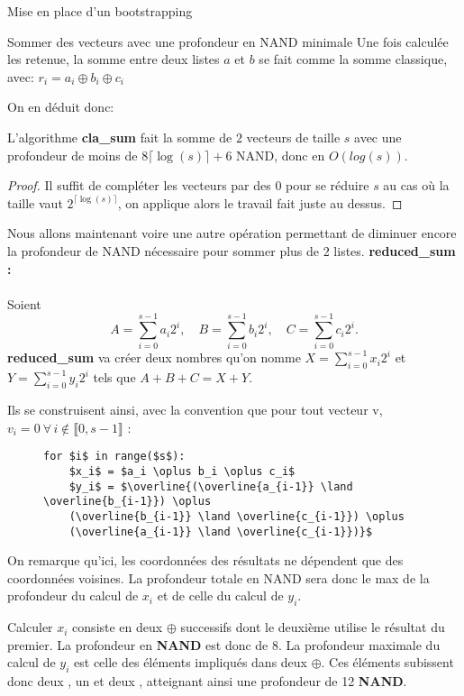 \begin{section}{Mise en place d'un bootstrapping}
\begin{subsection}{Sommer des vecteurs avec une profondeur en NAND minimale}
Une fois calculée les retenue, la somme entre deux listes $a$ et $b$ se fait
comme la somme classique, avec:
$r_i = a_i \oplus b_i \oplus c_i$

On en déduit donc:

\begin{thm}
L'algorithme \textbf{cla\_sum} fait la somme de $2$ vecteurs de taille $s$ 
avec une profondeur de moins de $8 \lceil \log(s) \rceil + 6$ NAND, donc 
en $O(log(s))$.
\end{thm}
\begin{proof}
Il suffit de compléter les vecteurs par des $0$ pour se réduire $s$ au cas où
la taille vaut $2^{\lceil \log(s) \rceil}$, on applique alors le travail fait juste au dessus.
\end{proof}

Nous allons maintenant voire une autre opération permettant de diminuer 
encore la profondeur de NAND nécessaire pour sommer plus de 2 listes. 
\vspace{0.3cm}
\noindent
\textbf{reduced\_sum :}
\paragraph{}

	Soient 
\[A = \sum_{i=0}^{s-1} a_i 2^i, \quad B = \sum_{i=0}^{s-1} b_i 2^i, \quad C = \sum_{i=0}^{s-1} c_i 2^i. \]
\textbf{reduced\_sum} va créer deux nombres qu'on nomme $X = \sum_{i=0}^{s-1} x_i 2^i$  et $Y = \sum_{i=0}^{s-1} y_i 2^i$ tels que $A + B + C = X + Y$.

	Ils se construisent ainsi, avec la convention que pour tout vecteur v, $v_i = 0 \  \forall \, i \not\in \llbracket 0, s-1 \rrbracket$ :
\begin{figure}[!h]
\begin{lstlisting}
for $i$ in range($s$):
	$x_i$ = $a_i \oplus b_i \oplus c_i$
	$y_i$ = $\overline{(\overline{a_{i-1}} \land \overline{b_{i-1}}) \oplus
	(\overline{b_{i-1}} \land \overline{c_{i-1}}) \oplus
	(\overline{a_{i-1}} \land \overline{c_{i-1}})}$
\end{lstlisting}
\end{figure}

	On remarque qu'ici, les coordonnées des résultats ne dépendent que des coordonnées voisines. La profondeur totale en NAND sera donc le max de la profondeur du calcul de $x_i$ et de celle du calcul de $y_i$.
	
	Calculer $x_i$ consiste en deux $\oplus$ successifs dont le deuxième utilise le résultat du premier. La profondeur en \textbf{NAND} est donc de 8. La profondeur maximale du calcul de $y_i$ est celle des éléments impliqués dans deux $\oplus$. Ces éléments subissent donc deux , un  et deux , atteignant ainsi une profondeur de 12 \textbf{NAND}.


\end{subsection}
\end{section}
